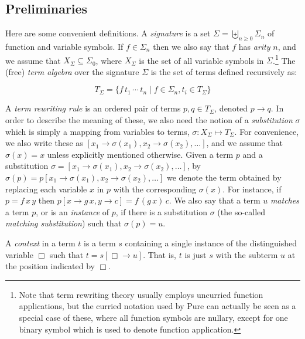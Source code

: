 \documentclass[a4paper,12pt]{article}
\begin{document}
\subsection{Preliminaries}

Here are some convenient definitions. A \emph{signature} is a set $\Sigma=\biguplus_{n\geq 0}\Sigma_n$ of function and variable symbols. If $f\in\Sigma_n$ then we also say that $f$ has \emph{arity} $n$, and we assume that $X_\Sigma\subseteq\Sigma_0$, where $X_\Sigma$ is the set of all variable symbols in $\Sigma$.\footnote{Note that term rewriting theory usually employs uncurried function applications, but the curried notation used by Pure can actually be seen as a special case of these, where all function symbols are nullary, except for one binary symbol which is used to denote function application.} The (free) \emph{term algebra} over the signature $\Sigma$ is the set of terms defined recursively as:

\[ T_\Sigma=\{f\,t_1\,\cdots\,t_n\mathrel{|}f\in\Sigma_n,t_i\in T_\Sigma\} \]

A \emph{term rewriting rule} is an ordered pair of terms $p,q\in T_\Sigma$, denoted $p\rightarrow q$. In order to describe the meaning of these, we also need the notion of a \emph{substitution} $\sigma$ which is simply a mapping from variables to terms, $\sigma:X_\Sigma\mapsto T_\Sigma$. For convenience, we also write these as $[x_1\rightarrow\sigma(x_1),x_2\rightarrow\sigma(x_2),\ldots]$, and we assume that $\sigma(x)=x$ unless explicitly mentioned otherwise. Given a term $p$ and a substitution $\sigma=[x_1\rightarrow\sigma(x_1),x_2\rightarrow\sigma(x_2),\ldots]$, by $\sigma(p)=p[x_1\rightarrow\sigma(x_1),x_2\rightarrow\sigma(x_2),\ldots]$ we denote the term obtained by replacing each variable $x$ in $p$ with the corresponding $\sigma(x)$. For instance, if $p = f\,x\,y$ then $p[x\rightarrow g\,x,y\rightarrow c]=f\,(g\,x)\,c$. We also say that a term $u$ \emph{matches} a term $p$, or is an \emph{instance} of $p$, if there is a substitution $\sigma$ (the so-called \emph{matching substitution}) such that $\sigma(p)=u$.

A \emph{context} in a term $t$ is a term $s$ containing a single instance of the distinguished variable $\Box$ such that $t=s[\Box\rightarrow u]$. That is, $t$ is just $s$ with the subterm $u$ at the position indicated by $\Box$.
\end{document}
